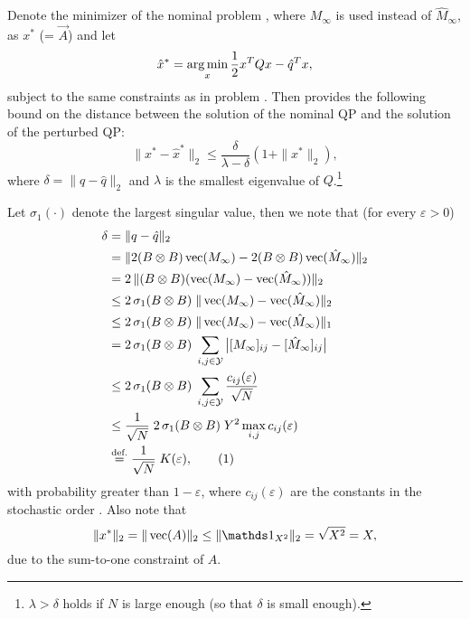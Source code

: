 \documentclass[journal]{IEEEtran}
\newcommand{\hMii}{\hat M_\infty}
\begin{document}
Denote the minimizer of the nominal problem , where
$M_\infty$ is used instead of $\hMii$, as $x^*$ (= $\vec{A}$) and let
\begin{equation}
    \hat x^* = \operatorname*{arg\,min}_x \frac{1}{2} x^T Q x - \hat q^T x,
\end{equation}
subject to the same constraints as in problem . Then
\cite[Theorem 2.1]{daniel_stability_1973} provides the following bound on the distance
between the solution of the nominal QP and the solution of the perturbed QP:
\begin{equation}
    \|x^* - \hat x^*\|_2 \leq \frac{\delta}{\lambda - \delta} (1
    + \|x^*\|_2),
    \label{eq:qp_bound}
\end{equation}
where $\delta = \|q - \hat q\|_2$ and $\lambda$ is the smallest eigenvalue
of $Q$.\footnote{$\lambda > \delta$ holds if $N$ is large
    enough (so that $\delta$ is small enough).}

Let $\sigma_1(\cdot)$ denote the largest singular value, then we note that (for
every $\varepsilon > 0$)
\begin{align*}
    \delta &= \|q-\hat q\|_2 \notag \\
                   &= \| 2(B\otimes B) \vec{M_\infty} - 2(B\otimes B) \vec{\hMii} \|_2 \\
                   &= 2\, \| (B\otimes B) (\vec{M_\infty} - \vec{\hMii}) \|_2 \\
                   &\leq 2\,\sigma_1(B \otimes B) \; \|\vec{M_\infty} - \vec{\hMii}\|_2 \\
                   &\leq 2\,\sigma_1(B \otimes B) \; \|\vec{M_\infty} - \vec{\hMii}\|_1 \\
                   &= 2\,\sigma_1(B \otimes B) \; \sum_{i,j\in\mathcal{Y}}\big| [M_\infty]_{ij} - [\hMii]_{ij}\big| \\
                   &\leq 2\,\sigma_1(B \otimes B) \; \sum_{i,j\in\mathcal{Y}} \frac{c_{ij}(\varepsilon)}{\sqrt{N}} \\
                   &\leq \frac{1}{\sqrt{N}} \; 2 \, \sigma_1(B \otimes B) \; Y^2 \max_{i,j} c_{ij}(\varepsilon) \\
                   &\overset{\text{def.}}{=} \frac{1}{\sqrt{N}} \; K(\varepsilon),
                    \stepcounter{equation}\tag{\theequation}
\end{align*}
with probability greater than $1-\varepsilon$, where $c_{ij}(\varepsilon)$ are
the constants in the stochastic order . Also note that
\begin{equation}
    \|x^*\|_2 = \| \vec{A} \|_2 \leq \| \ones_{X^2} \|_2 = \sqrt{X^2} = X,
\end{equation}
due to the sum-to-one constraint of $A$.
\end{document}
